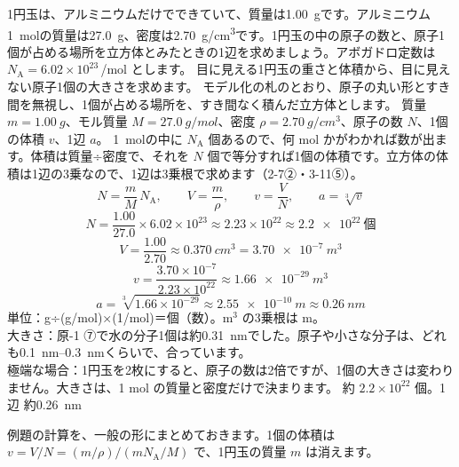 \begin{phreidai}\label{ph:原-0:ex1}
1円玉は、アルミニウムだけでできていて、質量は\qty{1.00}{g}です。アルミニウム\qty{1}{mol}の質量は\qty{27.0}{g}、密度は\qty{2.70}{g/cm^3}です。1円玉の中の原子の数と、原子1個が占める場所を立方体とみたときの1辺を求めましょう。アボガドロ定数は $N_{\mathrm A}=6.02\times10^{23}$\,/mol とします。
\phbamen
目に見える1円玉の重さと体積から、目に見えない原子1個の大きさを求めます。
\phmushi
モデル化の札のとおり、原子の丸い形とすき間を無視し、1個が占める場所を、すき間なく積んだ立方体とします。
\phzu
質量 $m=\qty{1.00}{g}$、モル質量 $M=\qty{27.0}{g/mol}$、密度 $\rho=\qty{2.70}{g/cm^3}$、原子の数 $N$、1個の体積 $v$、1辺 $a$。
\phriyu
\qty{1}{mol}の中に $N_{\mathrm A}$ 個あるので、何 mol かがわかれば数が出ます。体積は質量÷密度で、それを $N$ 個で等分すれば1個の体積です。立方体の体積は1辺の3乗なので、1辺は3乗根で求めます（2-7②・3-11⑤）。
\phtateru
\[N=\frac{m}{M}\,N_{\mathrm A},\qquad V=\frac{m}{\rho},\qquad v=\frac{V}{N},\qquad a=\sqrt[3]{v}\]
\phtoku
\[N=\frac{1.00}{27.0}\times6.02\times10^{23}\approx2.23\times10^{22}\approx\qty{2.2e22}{個}\]
\[V=\frac{1.00}{2.70}\approx\qty{0.370}{cm^3}=\qty{3.70e-7}{m^3}\]
\[v=\frac{3.70\times10^{-7}}{2.23\times10^{22}}\approx\qty{1.66e-29}{m^3}\]
\[a=\sqrt[3]{1.66\times10^{-29}}\approx\qty{2.55e-10}{m}\approx\qty{0.26}{nm}\]
\phtashikame
単位：g÷(g/mol)×(1/mol)＝個（数）。$\mathrm{m^3}$ の3乗根は m。\\
大きさ：原-1 ⑦で水の分子1個は約\qty{0.31}{nm}でした。原子や小さな分子は、どれも\qtyrange{0.1}{0.3}{nm}くらいで、合っています。\\
極端な場合：1円玉を2枚にすると、原子の数は2倍ですが、1個の大きさは変わりません。大きさは、1 mol の質量と密度だけで決まります。
\kotae 約 $2.2\times10^{22}$ 個。1辺 約\qty{0.26}{nm}
\end{phreidai}
\noindent 例題の計算を、一般の形にまとめておきます。1個の体積は $v=V/N=(m/\rho)\big/(mN_{\mathrm A}/M)$ で、1円玉の質量 $m$ は消えます。
\begin{phflow}
\end{phflow}

